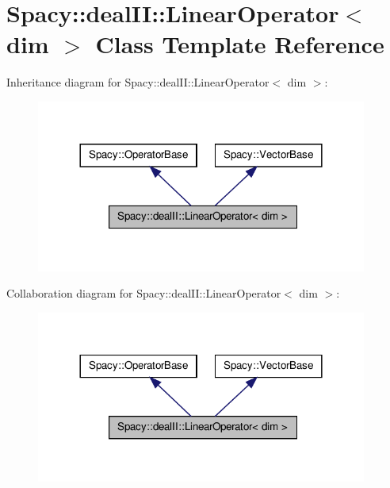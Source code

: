 \hypertarget{classSpacy_1_1dealII_1_1LinearOperator}{\section{\-Spacy\-:\-:deal\-I\-I\-:\-:\-Linear\-Operator$<$ dim $>$ \-Class \-Template \-Reference}
\label{classSpacy_1_1dealII_1_1LinearOperator}
}


\-Inheritance diagram for \-Spacy\-:\-:deal\-I\-I\-:\-:\-Linear\-Operator$<$ dim $>$\-:
\nopagebreak
\begin{figure}[H]
\begin{center}
\leavevmode
\includegraphics[width=308pt]{classSpacy_1_1dealII_1_1LinearOperator__inherit__graph}
\end{center}
\end{figure}


\-Collaboration diagram for \-Spacy\-:\-:deal\-I\-I\-:\-:\-Linear\-Operator$<$ dim $>$\-:
\nopagebreak
\begin{figure}[H]
\begin{center}
\leavevmode
\includegraphics[width=308pt]{classSpacy_1_1dealII_1_1LinearOperator__coll__graph}
\end{center}
\end{figure}
